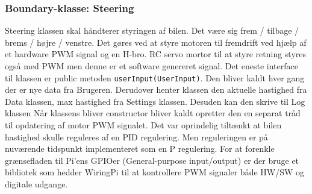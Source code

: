 \subsubsection{Boundary-klasse: Steering} %


Steering klassen skal håndterer styringen af bilen. Det være sig frem / tilbage / brems / højre / venstre.
Det gøres ved at styre motoren til fremdrift ved hjælp af et hardware PWM signal og en H-bro. 
RC servo mortor til at styre retning styres også med PWM men denne er et software genereret signal. 
Det eneste interface til klassen er public metoden \texttt{userInput(UserInput)}. 
Den bliver kaldt hver gang der er nye data fra Brugeren. Derudover henter klassen den aktuelle hastighed fra Data klassen, max hastighed fra Settings klassen. Desuden kan den skrive til Log klassen
Når klassens bliver constructor bliver kaldt opretter den en separat tråd til opdatering af motor PWM signalet. Det var oprindelig tiltænkt at bilen hastighed skulle reguleres af en PID regulering. Men reguleringen er på nuværende tidspunkt implementeret som en P regulering.
For at forenkle grænsefladen til Pi'ens GPIOer (General-purpose input/output) er der bruge et bibliotek som hedder WiringPi \cite{lib:wiringpi} til at kontrollere PWM signaler både HW/SW og digitale udgange. 
